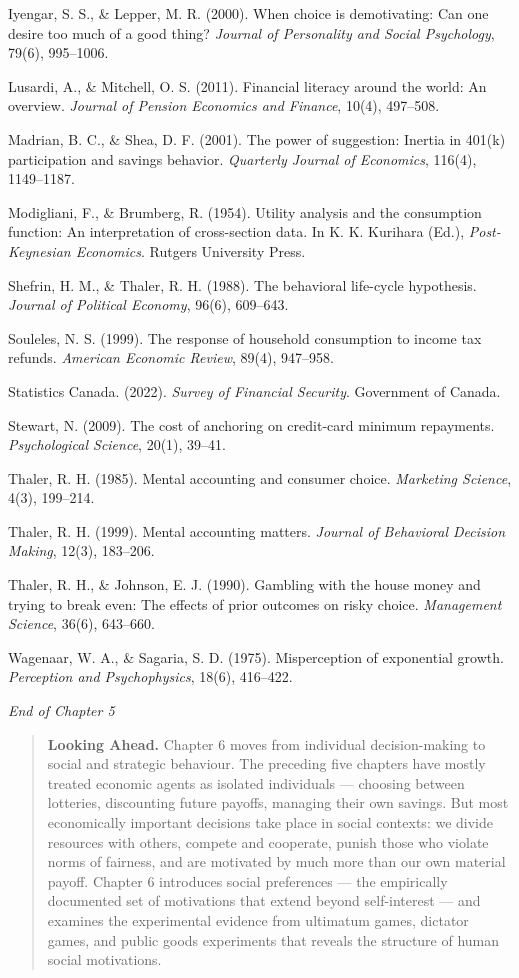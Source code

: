 \documentclass[12pt, letterpaper]{article}
\begin{document}
Iyengar, S. S., \& Lepper, M. R. (2000). When choice is demotivating: Can one desire too much of a good thing? \textit{Journal of Personality and Social Psychology}, 79(6), 995--1006.

Lusardi, A., \& Mitchell, O. S. (2011). Financial literacy around the world: An overview. \textit{Journal of Pension Economics and Finance}, 10(4), 497--508.

Madrian, B. C., \& Shea, D. F. (2001). The power of suggestion: Inertia in 401(k) participation and savings behavior. \textit{Quarterly Journal of Economics}, 116(4), 1149--1187.

Modigliani, F., \& Brumberg, R. (1954). Utility analysis and the consumption function: An interpretation of cross-section data. In K. K. Kurihara (Ed.), \textit{Post-Keynesian Economics}. Rutgers University Press.

Shefrin, H. M., \& Thaler, R. H. (1988). The behavioral life-cycle hypothesis. \textit{Journal of Political Economy}, 96(6), 609--643.

Souleles, N. S. (1999). The response of household consumption to income tax refunds. \textit{American Economic Review}, 89(4), 947--958.

Statistics Canada. (2022). \textit{Survey of Financial Security}. Government of Canada.

Stewart, N. (2009). The cost of anchoring on credit-card minimum repayments. \textit{Psychological Science}, 20(1), 39--41.

Thaler, R. H. (1985). Mental accounting and consumer choice. \textit{Marketing Science}, 4(3), 199--214.

Thaler, R. H. (1999). Mental accounting matters. \textit{Journal of Behavioral Decision Making}, 12(3), 183--206.

Thaler, R. H., \& Johnson, E. J. (1990). Gambling with the house money and trying to break even: The effects of prior outcomes on risky choice. \textit{Management Science}, 36(6), 643--660.

Wagenaar, W. A., \& Sagaria, S. D. (1975). Misperception of exponential growth. \textit{Perception and Psychophysics}, 18(6), 416--422.

\medskip

\textit{End of Chapter 5}

\medskip

\begin{quote}
\textbf{Looking Ahead.} Chapter 6 moves from individual decision-making to social and strategic behaviour. The preceding five chapters have mostly treated economic agents as isolated individuals --- choosing between lotteries, discounting future payoffs, managing their own savings. But most economically important decisions take place in social contexts: we divide resources with others, compete and cooperate, punish those who violate norms of fairness, and are motivated by much more than our own material payoff. Chapter 6 introduces social preferences --- the empirically documented set of motivations that extend beyond self-interest --- and examines the experimental evidence from ultimatum games, dictator games, and public goods experiments that reveals the structure of human social motivations.
\end{quote}
\end{document}
